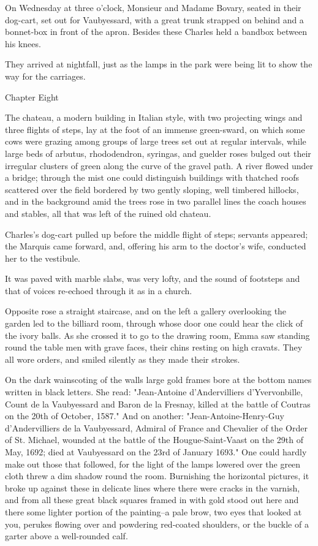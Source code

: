 \documentclass[11pt,twocolumn]{ltugboat}
\begin{document}
On Wednesday at three o'clock, Monsieur and Madame Bovary, seated in
their dog-cart, set out for Vaubyessard, with a great trunk strapped
on behind and a bonnet-box in front of the apron. Besides these Charles
held a bandbox between his knees.

They arrived at nightfall, just as the lamps in the park were being lit
to show the way for the carriages.



Chapter Eight

The chateau, a modern building in Italian style, with two projecting
wings and three flights of steps, lay at the foot of an immense
green-sward, on which some cows were grazing among groups of large trees
set out at regular intervals, while large beds of arbutus, rhododendron,
syringas, and guelder roses bulged out their irregular clusters of
green along the curve of the gravel path. A river flowed under a bridge;
through the mist one could distinguish buildings with thatched roofs
scattered over the field bordered by two gently sloping, well timbered
hillocks, and in the background amid the trees rose in two parallel
lines the coach houses and stables, all that was left of the ruined old
chateau.

Charles's dog-cart pulled up before the middle flight of steps; servants
appeared; the Marquis came forward, and, offering his arm to the
doctor's wife, conducted her to the vestibule.

It was paved with marble slabs, was very lofty, and the sound of
footsteps and that of voices re-echoed through it as in a church.

Opposite rose a straight staircase, and on the left a gallery
overlooking the garden led to the billiard room, through whose door one
could hear the click of the ivory balls. As she crossed it to go to the
drawing room, Emma saw standing round the table men with grave faces,
their chins resting on high cravats. They all wore orders, and smiled
silently as they made their strokes.

On the dark wainscoting of the walls large gold frames bore at
the bottom names written in black letters. She read: "Jean-Antoine
d'Andervilliers d'Yvervonbille, Count de la Vaubyessard and Baron de la
Fresnay, killed at the battle of Coutras on the 20th of October,
1587." And on another: "Jean-Antoine-Henry-Guy d'Andervilliers de
la Vaubyessard, Admiral of France and Chevalier of the Order of St.
Michael, wounded at the battle of the Hougue-Saint-Vaast on the 29th of
May, 1692; died at Vaubyessard on the 23rd of January 1693." One could
hardly make out those that followed, for the light of the lamps lowered
over the green cloth threw a dim shadow round the room. Burnishing the
horizontal pictures, it broke up against these in delicate lines where
there were cracks in the varnish, and from all these great black squares
framed in with gold stood out here and there some lighter portion of the
painting--a pale brow, two eyes that looked at you, perukes flowing over
and powdering red-coated shoulders, or the buckle of a garter above a
well-rounded calf.
\end{document}
